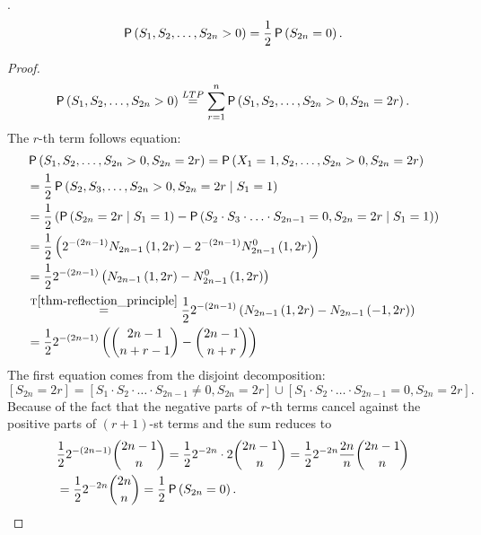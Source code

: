 \begin{lemma}\label{lemma-probability_strictly_above}
 \Lrws.
 \[
 \operatorname{\mathsf{P}} \left( S_1, S_2, \ldots, S_{2n}>0 \right)
 =\frac{1}{2} \operatorname{\mathsf{P}} \left( S_{2n}=0 \right).
 \]
\end{lemma}
\begin{proof}
 \[
 \pr \left( S_1, S_2, \ldots, S_{2n}>0 \right)
 \ltp \suma[r][1][n]\pr \left( S_1, S_2, \ldots, S_{2n}> 0, S_{2n}=2r \right).
 \]
 The $r$-th term follows equation:
 \[
 \begin{split}
   & \operatorname{\mathsf{P}} \left( S_1, S_2, \ldots, S_{2n}> 0, S_{2n}=2r \right)
   =\operatorname{\mathsf{P}} \left( X_1=1, S_2, \ldots, S_{2n}> 0, S_{2n}=2r \right)\\
   & =\frac{1}{2} \operatorname{\mathsf{P}} \left( S_2, S_3, \ldots, S_{2n}> 0, S_{2n}=2r \;\middle\vert\; S_1=1 \right)\\
   & =\frac{1}{2} \left( \operatorname{\mathsf{P}} \left( S_{2n}=2r\;\middle\vert\; S_1=1 \right) -\operatorname{\mathsf{P}} \left(S_2\cdot S_3 \cdot \ldots \cdot S_{2n-1}=0, S_{2n}=2r \;\middle\vert\; S_1=1\right) \right)\\
   & =\frac{1}{2} \left( 2^{-\left(2n-1\right)}N_{2n-1} \left( 1,2r \right) -2^{-\left(2n-1\right)}N_{2n-1}^0 \left( 1,2r \right) \right)\\
   & =\frac{1}{2} 2^{-\left(2n-1\right)} \left( N_{2n-1} \left( 1,2r \right) -N_{2n-1}^0 \left( 1,2r \right) \right) \\
   & \overset{\text{T}\ref{thm-reflection_principle}}{=}\frac{1}{2} 2^{-\left(2n-1\right)} \left( N_{2n-1} \left( 1,2r \right) -N_{2n-1} \left( -1,2r \right) \right)\\
   & =\frac{1}{2} 2^{-\left(2n-1\right)} \left( \binom{2n-1}{n+r-1}-\binom{2n-1}{n+r} \right)
           \end{split}
 \]
     The first equation comes from the disjoint decomposition:
     \[
     [S_{2n}=2r]=[S_1\cdot S_2 \cdot \ldots \cdot S_{2n-1} \neq 0, S_{2n}=2r]\cup[S_1\cdot S_2 \cdot \ldots \cdot S_{2n-1}=0, S_{2n}=2r].
     \]
 Because of the fact that the negative parts of $r$-th terms cancel against the positive parts of
 $\left( r+1 \right) $-st terms and the sum reduces to
 \[
  \begin{split}
   & \frac{1}{2} 2^{-\left(2n-1\right)}\binom{2n-1}{n}
   =\frac{1}{2} 2^{-2n}\cdot 2\binom{2n-1}{n}
   =\frac{1}{2} 2^{-2n}\frac{2n}{n}\binom{2n-1}{n} \\
   &=\frac{1}{2} 2^{-2n}\binom{2n}{n}
   =\frac{1}{2} \operatorname{\mathsf{P}} \left( S_{2n}=0 \right).
  \end{split}
 \]
\end{proof}
